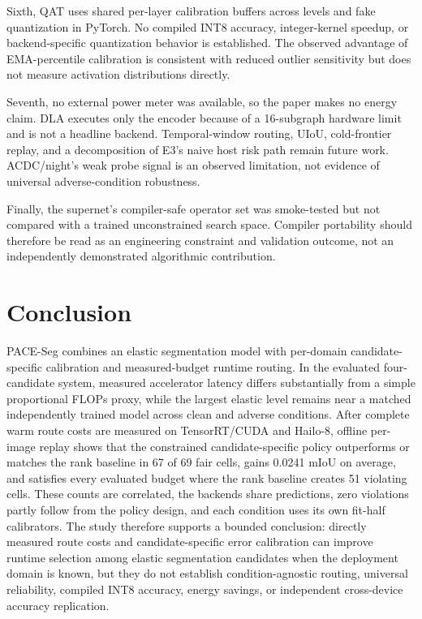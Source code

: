 \documentclass[a4paper,review,12pt]{elsarticle}
\newcommand{\method}{PACE-Seg}
\newcommand{\miou}{mIoU}
\begin{document}
Sixth, QAT uses shared per-layer calibration buffers across levels and fake quantization in PyTorch. No compiled INT8 accuracy, integer-kernel speedup, or backend-specific quantization behavior is established. The observed advantage of EMA-percentile calibration is consistent with reduced outlier sensitivity but does not measure activation distributions directly.

Seventh, no external power meter was available, so the paper makes no energy claim. DLA executes only the encoder because of a 16-subgraph hardware limit and is not a headline backend. Temporal-window routing, UIoU, cold-frontier replay, and a decomposition of E3's naive host risk path remain future work. ACDC/night's weak probe signal is an observed limitation, not evidence of universal adverse-condition robustness.

Finally, the supernet's compiler-safe operator set was smoke-tested but not compared with a trained unconstrained search space. Compiler portability should therefore be read as an engineering constraint and validation outcome, not an independently demonstrated algorithmic contribution.

\section{Conclusion}
\label{sec:conclusion}

\method{} combines an elastic segmentation model with per-domain candidate-specific calibration and measured-budget runtime routing. In the evaluated four-candidate system, measured accelerator latency differs substantially from a simple proportional FLOPs proxy, while the largest elastic level remains near a matched independently trained model across clean and adverse conditions. After complete warm route costs are measured on TensorRT/CUDA and Hailo-8, offline per-image replay shows that the constrained candidate-specific policy outperforms or matches the rank baseline in 67 of 69 fair cells, gains 0.0241 \miou{} on average, and satisfies every evaluated budget where the rank baseline creates 51 violating cells. These counts are correlated, the backends share predictions, zero violations partly follow from the policy design, and each condition uses its own fit-half calibrators. The study therefore supports a bounded conclusion: directly measured route costs and candidate-specific error calibration can improve runtime selection among elastic segmentation candidates when the deployment domain is known, but they do not establish condition-agnostic routing, universal reliability, compiled INT8 accuracy, energy savings, or independent cross-device accuracy replication.
\end{document}
